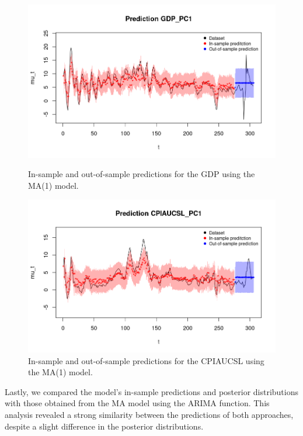 \begin{figure}[H]
    \centering
    \begin{minipage}{0.49\textwidth}
        \centering
        \includegraphics[width=\textwidth]{images/3-MA/gdp_prediction.png}
        \caption{In-sample and out-of-sample predictions for the GDP using the MA(1) model.}
        \label{fig:MA1_gdp_prediction}
    \end{minipage}\hfill
    \begin{minipage}{0.49\textwidth}
        \centering
        \includegraphics[width=\textwidth]{images/3-MA/infl_prediction.png}
        \caption{In-sample and out-of-sample predictions for the CPIAUCSL using the MA(1) model.}
        \label{fig:MA1_infl_prediction}
    \end{minipage}
\end{figure}
Lastly, we compared the model's in-sample predictions and posterior distributions with those obtained from the MA model using the ARIMA function. This analysis revealed a strong similarity between the predictions of both approaches, despite a slight difference in the posterior distributions.
